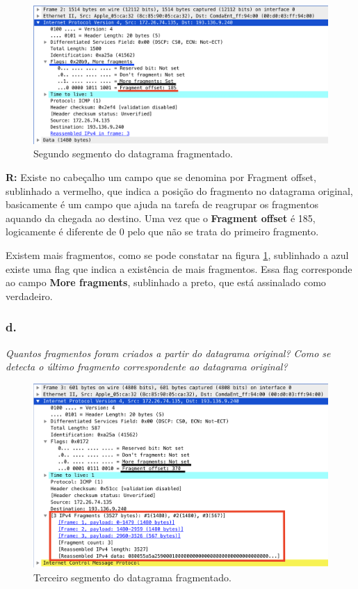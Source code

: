 \documentclass{llncs}
\begin{document}
\begin{figure}[H]
\begin{center}
\includegraphics[scale=0.45]{3_c.png} 
\end{center}
\caption{\label{fig:3_c}Segundo segmento do datagrama fragmentado.}
\end{figure}

\textbf{R:} Existe no cabeçalho um campo que se denomina por Fragment offset, sublinhado a vermelho, que indica a posição do fragmento no datagrama original, basicamente é um campo que ajuda na tarefa de reagrupar os fragmentos aquando da chegada ao destino. Uma vez que o \textbf{Fragment offset} é 185, logicamente é diferente de 0 pelo que não se trata do primeiro fragmento.

Existem mais fragmentos, como se pode constatar na figura \ref{fig:3_c}, sublinhado a azul existe uma flag que indica a existência de mais fragmentos. Essa flag corresponde ao campo \textbf{More fragments}, sublinhado a preto, que está assinalado como verdadeiro.

\subsubsection{d.}
\emph{Quantos fragmentos foram criados a partir do datagrama original?
Como se detecta o último fragmento correspondente ao datagrama original?}

\begin{figure}[H]
\begin{center}
\includegraphics[scale=0.40]{3_d.png} 
\end{center}
\caption{\label{fig:3_d}Terceiro segmento do datagrama fragmentado.}
\end{figure}
\end{document}
